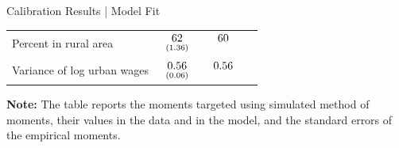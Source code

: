 \documentclass[9pt,pdftex,aspectratio=1610]{beamer}
\theoremstyle{definition}
\begin{document}
\begin{frame}[t]{Calibration Results | Model Fit}
\begin{table}[!t]
\begin{center}
\begin{tabular}{l l c c}
Percent in rural area &
$\begin{array}{c}62\vspace{-.15cm}\\ \scriptstyle (1.36)\end{array}$ &
$\begin{array}{c}60\vspace{-.15cm}\\ \scriptstyle \phantom{(0.18)}\end{array}$ & \\

Variance of log urban wages  &
$\begin{array}{c}0.56\vspace{-.15cm}\\ \scriptstyle (0.06)\end{array}$ &
$\begin{array}{c}0.56\vspace{-.15cm}\\ \scriptstyle \phantom{(0.18)}\end{array}$ & \\
\hline
\end{tabular}
\parbox[c]{4.25in}{\vspace{.1cm}
{\footnotesize \textbf{Note:} The table reports the moments targeted using simulated method of moments, their values in the data and in the model, and the standard errors of the empirical moments.}
}
\end{center}
\end{table}
\end{frame}
\end{document}
